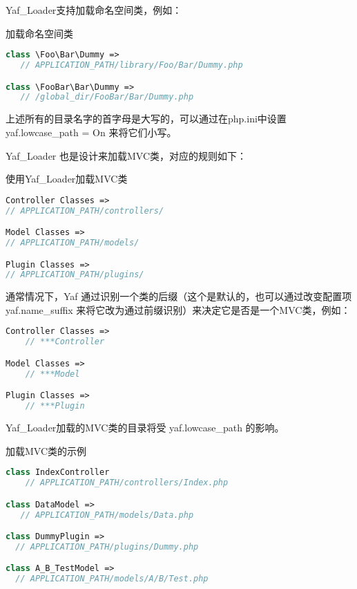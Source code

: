 Yaf\_Loader支持加载命名空间类，例如：

\begin{example}
加载命名空间类
\begin{lstlisting}[language=PHP]
class \Foo\Bar\Dummy =>
   // APPLICATION_PATH/library/Foo/Bar/Dummy.php

class \FooBar\Bar\Dummy =>
   // /global_dir/FooBar/Bar/Dummy.php
\end{lstlisting}
\end{example}

上述所有的目录名字的首字母是大写的，可以通过在php.ini中设置 yaf.lowcase\_path = On 来将它们小写。

Yaf\_Loader 也是设计来加载MVC类，对应的规则如下：

\begin{example}
使用Yaf\_Loader加载MVC类
\begin{lstlisting}[language=PHP]
Controller Classes =>
// APPLICATION_PATH/controllers/

Model Classes =>
// APPLICATION_PATH/models/

Plugin Classes =>
// APPLICATION_PATH/plugins/
\end{lstlisting}
\end{example}

通常情况下，Yaf 通过识别一个类的后缀（这个是默认的，也可以通过改变配置项 yaf.name\_suffix 来将它改为通过前缀识别）来决定它是否是一个MVC类，例如：

\begin{lstlisting}[language=PHP]
Controller Classes =>
    // ***Controller

Model Classes =>
    // ***Model

Plugin Classes =>
    // ***Plugin
\end{lstlisting}


Yaf\_Loader加载的MVC类的目录将受 yaf.lowcase\_path 的影响。

\begin{example}
加载MVC类的示例
\begin{lstlisting}[language=PHP]
class IndexController
    // APPLICATION_PATH/controllers/Index.php

class DataModel =>
   // APPLICATION_PATH/models/Data.php

class DummyPlugin =>
  // APPLICATION_PATH/plugins/Dummy.php

class A_B_TestModel =>
  // APPLICATION_PATH/models/A/B/Test.php
\end{lstlisting}
\end{example}



